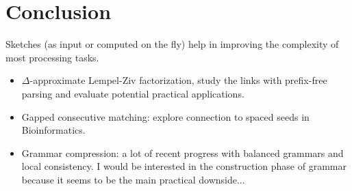 \documentclass[aspectratio=169]{beamer}
\begin{document}
\section{Conclusion}
\begin{frame}
  \vfill
  \bigskip
  \begin{center}
    \pause
  \end{center}
  \vfill
\end{frame}

\begin{frame}
  \begin{center}
  \end{center}
   Sketches (as input or computed on the fly) help in improving the complexity of most processing tasks.

  \medskip
  \begin{itemize}
    \item {} $\Delta$-approximate Lempel-Ziv factorization, study the links with prefix-free parsing and evaluate potential practical applications.
    \item Gapped consecutive matching: explore connection to spaced seeds in Bioinformatics.
    \item Grammar compression: a lot of recent progress with balanced grammars and local consistency. I would be interested in the construction phase of grammar because it seems to be the main practical downside...
  \end{itemize}

  \vfill
  \begin{center}
  \end{center}
\end{frame}

\backupbegin



\begin{frame}
  \tableofcontents
\end{frame}
\backupend
\end{document}
